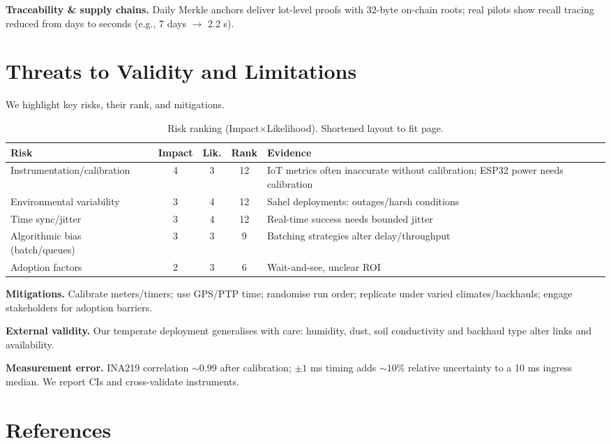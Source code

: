 \documentclass[12pt,onecolumn]{IEEEtran} %
\begin{document}
\textbf{Traceability \& supply chains.} Daily Merkle anchors deliver lot-level proofs with 32-byte on-chain roots; real pilots show recall tracing reduced from days to seconds (e.g., 7 days \(\to\) 2.2 s).

\section{Threats to Validity and Limitations}
\label{sec:threats}
We highlight key risks, their rank, and mitigations.

\begingroup
\setlength{\tabcolsep}{3pt}\footnotesize
\begin{table}[ht]
  \centering
  \caption{Risk ranking (Impact\(\times\)Likelihood). Shortened layout to fit page.}
  \label{tab:risk-table}
  \begin{tabularx}{\textwidth}{l c c c X}
    \toprule
    \textbf{Risk} & \textbf{Impact} & \textbf{Lik.} & \textbf{Rank} & \textbf{Evidence} \\
    \midrule
    Instrumentation/calibration & 4 & 3 & 12 & IoT metrics often inaccurate without calibration; ESP32 power needs calibration \\
    Environmental variability & 3 & 4 & 12 & Sahel deployments: outages/harsh conditions \\
    Time sync/jitter & 3 & 4 & 12 & Real-time success needs bounded jitter \\
    Algorithmic bias (batch/queues) & 3 & 3 & 9 & Batching strategies alter delay/throughput \\
    Adoption factors & 2 & 3 & 6 & Wait-and-see, unclear ROI \\
    \bottomrule
  \end{tabularx}
\end{table}
\endgroup

\textbf{Mitigations.} Calibrate meters/timers; use GPS/PTP time; randomise run order; replicate under varied climates/backhauls; engage stakeholders for adoption barriers.

\textbf{External validity.} Our temperate deployment generalises with care: humidity, dust, soil conductivity and backhaul type alter links and availability.

\textbf{Measurement error.} INA219 correlation \(\sim0.99\) after calibration; \(\pm1\) ms timing adds \(\sim10\%\) relative uncertainty to a 10 ms ingress median. We report CIs and cross-validate instruments.


\section{References}\label{sec:references}
% 

\clearpage

\end{document}
